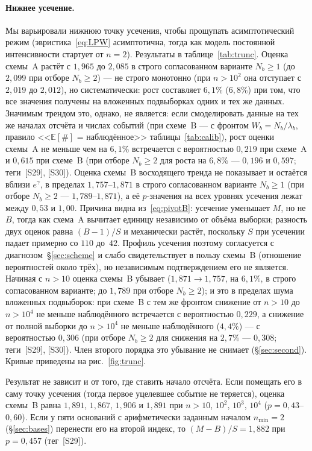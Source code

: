 \documentclass[11pt,a4paper]{article}
\theoremstyle{plain}
\theoremstyle{remark}
\newcommand{\eg}{e^{\gamma}}
\begin{document}
\paragraph{Нижнее усечение.} Мы варьировали нижнюю точку усечения, чтобы прощупать
асимптотический режим (эвристика~\eqref{eq:LPW} асимптотична, тогда как модель
постоянной интенсивности стартует от $n=2$). Результаты в таблице~\ref{tab:trunc}.
Оценка схемы~A растёт с $1{,}965$ до $2{,}085$ в строго согласованном варианте
$N_b\ge1$ (до $2{,}099$ при отборе $N_b\ge2$) --- не строго монотонно (при
$n>10^{2}$ она отступает с $2{,}019$ до $2{,}012$), но систематически: рост
составляет $6{,}1\%$ ($6{,}8\%$) при том, что все значения получены на вложенных
подвыборках одних и тех же данных. Значимым трендом это, однако, не является: если
смоделировать данные на тех же началах отсчёта и числах событий (при схеме~B ---
с фронтом $W_b=N_b/\lambda_b$, правило <<$\mathbb E[\#]$ = наблюдённое>>
таблицы~\ref{tab:calib}), рост оценки схемы~A не меньше чем на $6{,}1\%$
встречается с вероятностью $0{,}219$ при схеме~A и $0{,}615$ при схеме~B (при отборе
$N_b\ge2$ для роста на $6{,}8\%$ --- $0{,}196$ и $0{,}597$; теги~[S29], [S30]). Оценка схемы~B восходящего
тренда не показывает и остаётся вблизи $\eg$, в пределах $1{,}757$--$1{,}871$ в строго согласованном
варианте $N_b\ge1$ (при отборе $N_b\ge2$ --- $1{,}789$--$1{,}871$), а её
$p$-значения на всех уровнях усечения лежат между $0{,}53$ и $1{,}00$. Причина видна
из~\eqref{eq:pivotB}: усечение уменьшает $M$, но не $B$, тогда как схема~A
вычитает единицу независимо от объёма выборки; разность двух оценок равна
$(B-1)/S$ и механически растёт, поскольку $S$ при усечении падает примерно со
$110$ до~$42$. Профиль усечения поэтому согласуется с диагнозом~\S\ref{sec:scheme}
и слабо свидетельствует в пользу схемы~B (отношение вероятностей около трёх), но
независимым подтверждением его не является. Начиная с $n>10$ оценка схемы~B
убывает ($1{,}871\to1{,}757$, на $6{,}1\%$, в строго согласованном варианте; до
$1{,}789$ при отборе $N_b\ge2$); и это в пределах шума вложенных подвыборок: при
схеме~B с тем же фронтом снижение от $n>10$ до $n>10^4$ не меньше наблюдённого
встречается с вероятностью $0{,}229$, а снижение от полной выборки до $n>10^4$ не
меньше наблюдённого ($4{,}4\%$) --- с вероятностью $0{,}306$ (при отборе $N_b\ge2$
для снижения на $2{,}7\%$ --- $0{,}308$; теги~[S29], [S30]). Член второго порядка это убывание не снимает
(\S\ref{sec:second}). Кривые приведены на рис.~\ref{fig:trunc}.

Результат не зависит и от того, где ставить начало отсчёта. Если помещать его в
саму точку усечения (тогда первое уцелевшее событие не теряется), оценка схемы~B
равна $1{,}891$, $1{,}867$, $1{,}906$ и $1{,}891$ при $n>10$, $10^2$, $10^3$, $10^4$
($p=0{,}43$--$0{,}60$). Если у пяти оснований с арифметически заданным началом
$n_{\min}=2$ (\S\ref{sec:bases}) перенести его на второй индекс, то
$(M-B)/S=1{,}882$ при $p=0{,}457$ (тег~[S29]).
\end{document}
